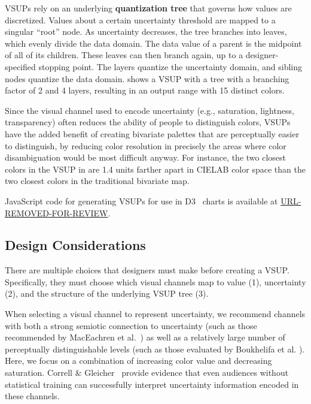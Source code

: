 VSUPs rely on an underlying \textbf{quantization tree} that governs how values are discretized. Values about a certain uncertainty threshold are mapped to a singular ``root'' node. As uncertainty decreases, the tree branches into leaves, which evenly divide the data domain. The data value of a parent is the midpoint of all of its children. These leaves can then branch again, up to a designer-specified stopping point. The layers quantize the uncertainty domain, and sibling nodes quantize the data domain.  shows a VSUP with a tree with a branching factor of 2 and 4 layers, resulting in an output range with 15 distinct colors.

Since the visual channel used to encode uncertainty (e.g., saturation, lightness, transparency) often reduces the ability of people to distinguish colors, VSUPs have the added benefit of creating bivariate palettes that are perceptually easier to distinguish, by reducing color resolution in precisely the areas where color disambiguation would be most difficult anyway. For instance, the two closest colors in the VSUP in  are 1.4 units farther apart in CIELAB color space than the two closest colors in the traditional bivariate map.

JavaScript code for generating VSUPs for use in D3~\cite{bostock2011d3} charts is available at \url{URL-REMOVED-FOR-REVIEW}.

\subsection{Design Considerations}

There are multiple choices that designers must make before creating a VSUP. Specifically, they must choose which visual channels map to value (1), uncertainty (2), and the structure of the underlying VSUP tree (3).

When selecting a visual channel to represent uncertainty, we recommend channels with both a strong semiotic connection to uncertainty (such as those recommended by MacEachren et al.~\cite{maceachren2012visual}) as well as a relatively large number of perceptually distinguishable levels (such as those evaluated by Boukhelifa et al. \cite{boukhelifa2012evaluating}). Here, we focus on a combination of increasing color value and decreasing saturation. Correll \& Gleicher~\cite{correll2013error} provide evidence that even audiences without statistical training can successfully interpret uncertainty information encoded in these channels.

